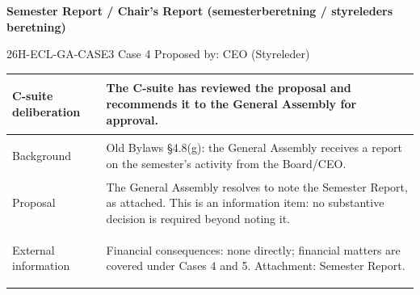 \documentclass{../../../Common/Latex/Templates/rapport}
\begin{document}
\reportmainmatter
\small
\setlength{\parindent}{0pt}
\setlength{\tabcolsep}{6pt}
\renewcommand{\arraystretch}{1.2}

\begin{center}
  {\Large\bfseries Semester Report / Chair's Report (semesterberetning / styreleders beretning)}\par
  \vspace{0.15cm}
  {\normalsize 26H-ECL-GA-CASE3 \textperiodcentered{} Case 4 \textperiodcentered{} Proposed by: CEO (Styreleder)}\par
  \vspace{0.1cm}
  {\small \meetingline}\par
\end{center}

\vspace{0.3cm}
\begin{tabularx}{\textwidth}{|>{\bfseries\raggedright\arraybackslash}p{4.2cm}|X|}
  \hline
  C-suite deliberation & The C-suite has reviewed the proposal and recommends it to the General Assembly for approval. \\
  \hline
  Background           & Old Bylaws \S4.8(g): the General Assembly receives a report on the semester's activity from the Board/CEO. \\
  \hline
  Proposal             & The General Assembly resolves to note the Semester Report, as attached. This is an information item: no substantive decision is required beyond noting it. \\
  \hline
  External information & Financial consequences: none directly; financial matters are covered under Cases 4 and 5. Attachment: Semester Report. \\
  \hline
\end{tabularx}
\end{document}
